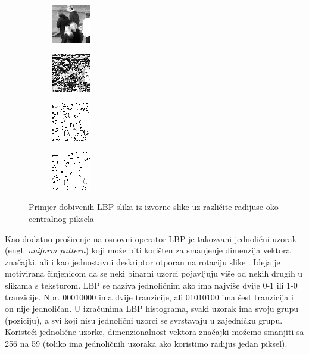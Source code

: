 \documentclass[times, utf8, zavrsni, numeric]{fer}
\begin{document}
\begin{figure}[ht]
\begin{subfigure}[b]{0.24\linewidth}
\centering
\includegraphics{img/1.jpg}
\end{subfigure}
\begin{subfigure}[b]{0.24\linewidth}
\centering
\includegraphics{img/2.jpg}
\end{subfigure}
\begin{subfigure}[b]{0.24\linewidth}
\centering
\includegraphics{img/3.jpg}
\end{subfigure}
\begin{subfigure}[b]{0.24\linewidth}
\centering
\includegraphics{img/4.jpg}
\end{subfigure}

\caption{Primjer dobivenih LBP slika iz izvorne slike uz različite radijuse oko centralnog piksela}
\end{figure}

Kao dodatno proširenje na osnovni operator LBP je takozvani jednolični uzorak 
(engl. \textit{uniform pattern}) koji može biti korišten za smanjenje dimenzija
vektora značajki, ali i kao jednostavni deskriptor otporan na rotaciju slike 
\citep{barkan}. Ideja je motivirana činjenicom da se neki 
binarni uzorci pojavljuju više od nekih drugih u slikama s teksturom. 
LBP se naziva jednoličnim ako ima najviše dvije 0-1 ili 1-0 tranzicije.
 Npr. 00010000 ima dvije tranzicije, ali 01010100 ima šest tranzicija 
 i on nije jednoličan. U izračunima LBP histograma, svaki uzorak ima 
 svoju grupu (poziciju), a svi koji nisu jednolični uzorci se 
 svrstavaju u zajedničku grupu. Koristeći jednolične uzorke,
  dimenzionalnost vektora značajki možemo smanjiti sa 256 na 59 
  (toliko ima jednoličnih uzoraka ako koristimo radijus jedan piksel).
\end{document}
